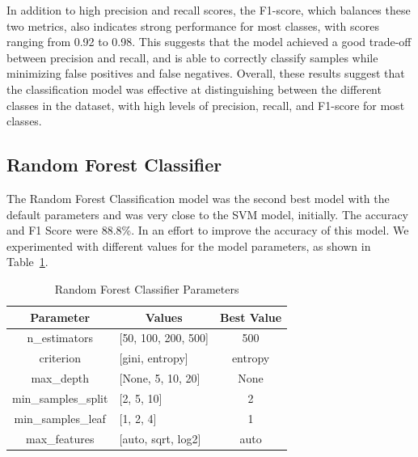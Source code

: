 \documentclass[conference]{IEEEtran}
\begin{document}
In addition to high precision and recall scores, the F1-score, which balances these two metrics, also indicates strong performance for most classes, with scores ranging from 0.92 to 0.98. This suggests that the model achieved a good trade-off between precision and recall, and is able to correctly classify samples while minimizing false positives and false negatives.
Overall, these results suggest that the classification model was effective at distinguishing between the different classes in the dataset, with high levels of precision, recall, and F1-score for most classes.

\subsection{Random Forest Classifier}
The Random Forest Classification model was the second best model with the default parameters and was very close to the SVM model, initially. 
The accuracy and F1 Score were 88.8\%. 
In an effort to improve the accuracy of this model. 
We experimented with different values for the model parameters, as shown in Table~\ref{tab:rf_parameters}.
\begin{table}[!h]
    \centering
    \label{tab:rf_parameters}
    \begin{tabular}{|c|l|c|}
    \hline
    \textbf{Parameter} & \multicolumn{1}{c|}{\textbf{Values}}     & \multicolumn{1}{l|}{\textbf{Best Value}} \\ \hline
    n\_estimators       & {[}50, 100, 200, 500{]}                  & 500                                      \\ \hline
    criterion          & {[}gini, entropy{]}                      & entropy                                  \\ \hline
    max\_depth          & {[}None, 5, 10, 20{]}                    & None                                     \\ \hline
    min\_samples\_split  & {[}2, 5, 10{]}                           & 2                                   \\ \hline
    min\_samples\_leaf   & {[}1, 2, 4{]}                            & 1                                 \\ \hline
    max\_features       & {[}auto, sqrt, log2{]}                   & auto                                    \\ \hline
    \end{tabular}
    \caption{Random Forest Classifier Parameters}
\end{table}
\end{document}
